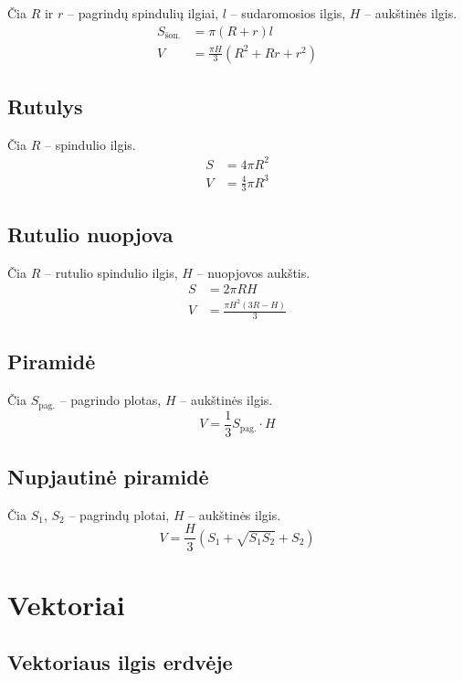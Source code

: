Čia $R$ ir $r$ – pagrindų spindulių ilgiai, $l$ – sudaromosios ilgis, $H$ – aukštinės ilgis.
\begin{align}
S_{\text{šon.}} &= \pi(R + r)l \\[6pt]
V &= \frac{\pi H}{3}(R^2 + Rr + r^2)
\end{align}

\subsection{Rutulys}

Čia $R$ – spindulio ilgis.
\begin{align}
S &= 4\pi R^2 \\[6pt]
V &= \frac{4}{3}\pi R^3
\end{align}

\subsection{Rutulio nuopjova}

Čia $R$ – rutulio spindulio ilgis, $H$ – nuopjovos aukštis.
\begin{align}
S &= 2\pi R H \\[6pt]
V &= \frac{\pi H^2(3R - H)}{3}
\end{align}

\subsection{Piramidė}

Čia $S_{\text{pag.}}$ – pagrindo plotas, $H$ – aukštinės ilgis.
\[
V = \frac{1}{3} S_{\text{pag.}} \cdot H
\]

\subsection{Nupjautinė piramidė}

Čia $S_1$, $S_2$ – pagrindų plotai, $H$ – aukštinės ilgis.
\[
V = \frac{H}{3}\!\left(S_1 + \sqrt{S_1 S_2} + S_2\right)
\]

\section{Vektoriai}

\subsection{Vektoriaus ilgis erdvėje}

